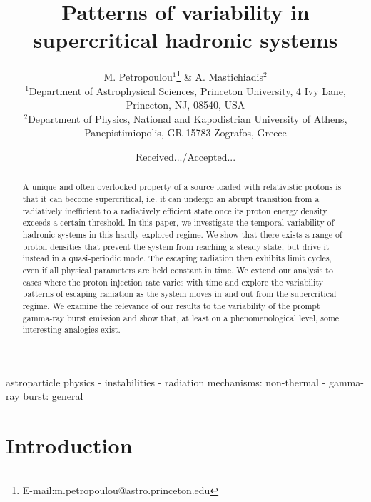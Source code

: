 \documentclass[fleqn,usenatbib]{mnras}
\title[Variability in hadronic supercriticality]
{Patterns of variability in supercritical hadronic systems}
\author[]{M. Petropoulou$^{1}$\thanks{E-mail:m.petropoulou@astro.princeton.edu} \& A. Mastichiadis$^{2}$ \\
$^{1}$Department of Astrophysical Sciences, Princeton University, 4 Ivy Lane, Princeton, NJ, 08540, USA \\
$^{2}$Department of Physics, National and Kapodistrian University of Athens, Panepistimiopolis, GR 15783 Zografos, Greece\\
}
\begin{document}
\date{Received.../Accepted...}

\pagerange{\pageref{firstpage}--\pageref{lastpage}} 

\maketitle

\label{firstpage}
\begin{abstract}



A unique and often overlooked property of a source loaded with relativistic protons is 
that it can become supercritical, i.e. it can undergo an abrupt transition from a radiatively inefficient to a radiatively efficient state
once its proton energy density exceeds a certain  threshold. In this paper, we investigate the temporal variability of hadronic systems in this hardly explored regime. We show that
there exists a range of proton densities that prevent the system 
from reaching a steady state, but drive it instead  in a quasi-periodic mode. The escaping radiation then exhibits  limit cycles, even if all physical parameters are held constant in time.  We extend our analysis to cases where the proton injection rate varies with time and explore the variability patterns of escaping radiation as the system moves in and out from the supercritical regime.  
We examine the relevance of  our results to the variability of the prompt gamma-ray burst emission and show that, at least on a phenomenological level, some interesting analogies exist. 
 
\end{abstract} 


\begin{keywords}
astroparticle physics - instabilities - radiation mechanisms: non-thermal - gamma-ray burst: general
\end{keywords}
\section{Introduction}
\label{intro}
\end{document}
